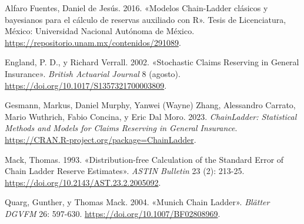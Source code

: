 \documentclass[
  12pt,
]{article}
\newlength{\cslhangindent}
\newlength{\cslentryspacingunit} %
\newenvironment{CSLReferences}[2] %
 {%
  \setlength{\parindent}{0pt}
  \ifodd #1
  \let\oldpar\par
  \def\par{\hangindent=\cslhangindent\oldpar}
  \fi
  \setlength{\parskip}{#2\cslentryspacingunit}
 }%
 {}
\begin{document}
\hypertarget{refs}{}
\begin{CSLReferences}{1}{0}
\leavevmode{}%
Alfaro Fuentes, Daniel de Jesús. 2016. {«Modelos Chain-Ladder clásicos y
bayesianos para el cálculo de reservas auxiliado con R»}. Tesis de
Licenciatura, México: Universidad Nacional Autónoma de México.
\url{https://repositorio.unam.mx/contenidos/291089}.

\leavevmode{}%
England, P. D., y Richard Verrall. 2002. {«Stochastic Claims Reserving
in General Insurance»}. \emph{British Actuarial Journal} 8 (agosto).
\url{https://doi.org/10.1017/S1357321700003809}.

\leavevmode{}%
Gesmann, Markus, Daniel Murphy, Yanwei (Wayne) Zhang, Alessandro
Carrato, Mario Wuthrich, Fabio Concina, y Eric Dal Moro. 2023.
\emph{ChainLadder: Statistical Methods and Models for Claims Reserving
in General Insurance}.
\url{https://CRAN.R-project.org/package=ChainLadder}.

\leavevmode{}%
Mack, Thomas. 1993. {«Distribution-free Calculation of the Standard
Error of Chain Ladder Reserve Estimates»}. \emph{ASTIN Bulletin} 23 (2):
213-25. \url{https://doi.org/10.2143/AST.23.2.2005092}.

\leavevmode{}%
Quarg, Gunther, y Thomas Mack. 2004. {«Munich Chain Ladder»}.
\emph{Bl{ä}tter DGVFM} 26: 597-630.
\url{https://doi.org/10.1007/BF02808969}.

\end{CSLReferences}
\end{document}
